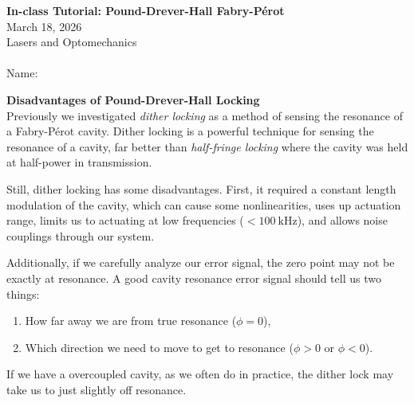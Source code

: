 \documentclass[11pt]{article}
\begin{document}
\begin{center}
    \textbf{In-class Tutorial: Pound-Drever-Hall Fabry-P\'erot}\\
    March 18, 2026\\
    Lasers and Optomechanics\\~\\
    Name: \underline{\hspace{10cm}}
\end{center}


\noindent
\textbf{Disadvantages of Pound-Drever-Hall Locking}\\
Previously we investigated \textit{dither locking} as a method of sensing the resonance of a Fabry-P\'erot cavity.
Dither locking is a powerful technique for sensing the resonance of a cavity, 
far better than \textit{half-fringe locking} where the cavity was held at half-power in transmission.

Still, dither locking has some disadvantages.
First, it required a constant length modulation of the cavity, 
which can cause some nonlinearities, 
uses up actuation range, 
limits us to actuating at low frequencies ($< 100~\mathrm{kHz}$),
and allows noise couplings through our system.

Additionally, if we carefully analyze our error signal, 
the zero point may not be exactly at resonance.  
A good cavity resonance error signal should tell us two things: 
\begin{enumerate}
    \item How far away we are from true resonance ($\phi = 0$),
    \item Which direction we need to move to get to resonance ($\phi > 0$ or $\phi < 0$).
\end{enumerate}
If we have a overcoupled cavity, as we often do in practice, the dither lock may take us to just slightly off resonance. 
\end{document}
